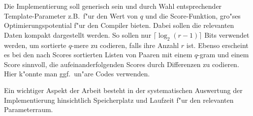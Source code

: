 \documentclass[12pt,a4paper]{scrartcl}
\begin{document}
Die Implementierung soll generisch sein und durch Wahl entsprechender
Template-Parameter z.B.\ f"ur den Wert von \(q\) und die Score-Funktion,
gro"ses Optimierungspotential f"ur den
Compiler bieten. Dabei sollen die relevanten Daten kompakt dargestellt
werden. So sollen nur \(\lceil\log_{2}(r-1)\rceil\) Bits verwendet werden,
um sortierte \(q\)-mere zu codieren, falls ihre Anzahl \(r\) ist. Ebenso
erscheint es bei den nach Scores sortierten Listen von Paaren mit einem
\(q\)-gram und einem Score sinnvoll, die aufeinanderfolgenden
Scores durch Differenzen zu codieren. Hier k"onnte man ggf.\ un"are
Codes verwenden.

Ein wichtiger Aspekt der Arbeit besteht in der systematischen Auswertung
der Implementierung hinsichtlich Speicherplatz und Laufzeit f"ur den
relevanten Parameterraum.



\end{document}
